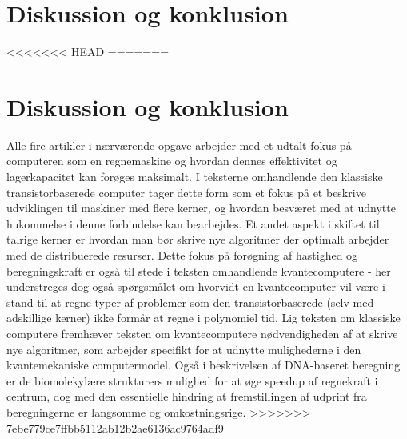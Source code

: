 \documentclass[10pt,a4paper]{article}
\begin{document}
\section{Diskussion og konklusion}
<<<<<<< HEAD
=======
\section{Diskussion og konklusion}
Alle fire artikler i nærværende opgave arbejder med et udtalt fokus på
computeren som en regnemaskine og hvordan dennes effektivitet og lagerkapacitet kan 
forøges maksimalt. I teksterne omhandlende den klassiske transistorbaserede
computer tager dette form som et fokus på et beskrive udviklingen til maskiner
med flere kerner, og hvordan besværet med at udnytte hukommelse i denne forbindelse
kan bearbejdes. Et andet aspekt i skiftet til talrige kerner er hvordan man bør
skrive nye algoritmer der optimalt arbejder med de distribuerede resurser. 
Dette fokus på forøgning af hastighed og beregningskraft er også til stede i
teksten omhandlende kvantecomputere - her understreges dog også spørgsmålet om 
hvorvidt en kvantecomputer vil være i stand til at regne typer af problemer som 
den transistorbaserede (selv med adskillige kerner) ikke formår at regne i 
polynomiel tid. Lig teksten om klassiske computere fremhæver teksten om 
kvantecomputere nødvendigheden af at skrive nye algoritmer, som arbejder 
specifikt for at udnytte mulighederne i den kvantemekaniske computermodel. 
Også i beskrivelsen af DNA-baseret beregning er de biomolekylære strukturers
mulighed for at øge speedup af regnekraft i centrum, dog med den essentielle
hindring at fremstillingen af udprint fra beregningerne er langsomme og 
omkostningsrige. 
>>>>>>> 7ebe779ce7ffbb5112ab12b2ae6136ac9764adf9
\end{document}
